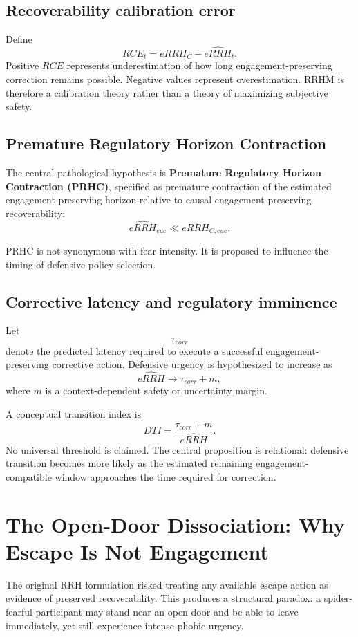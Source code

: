 \documentclass[9pt,twocolumn]{article}
\begin{document}
\subsection{Recoverability calibration error}
Define
\[
RCE_t=eRRH_C-\widehat{eRRH}_t.
\]
Positive $RCE$ represents underestimation of how long engagement-preserving correction remains possible. Negative values represent overestimation. RRHM is therefore a calibration theory rather than a theory of maximizing subjective safety.

\subsection{Premature Regulatory Horizon Contraction}
The central pathological hypothesis is \textbf{Premature Regulatory Horizon Contraction (PRHC)}, specified as premature contraction of the estimated engagement-preserving horizon relative to causal engagement-preserving recoverability:
\[
\widehat{eRRH}_{cue}\ll eRRH_{C,cue}.
\]

PRHC is not synonymous with fear intensity. It is proposed to influence the timing of defensive policy selection.

\subsection{Corrective latency and regulatory imminence}
Let
\[
\tau_{corr}
\]
denote the predicted latency required to execute a successful engagement-preserving corrective action. Defensive urgency is hypothesized to increase as
\[
\widehat{eRRH}\rightarrow \tau_{corr}+m,
\]
where $m$ is a context-dependent safety or uncertainty margin.

A conceptual transition index is
\[
DTI=\frac{\tau_{corr}+m}{\widehat{eRRH}}.
\]
No universal threshold is claimed. The central proposition is relational: defensive transition becomes more likely as the estimated remaining engagement-compatible window approaches the time required for correction.

\section{The Open-Door Dissociation: Why Escape Is Not Engagement}
The original RRH formulation risked treating any available escape action as evidence of preserved recoverability. This produces a structural paradox: a spider-fearful participant may stand near an open door and be able to leave immediately, yet still experience intense phobic urgency.
\end{document}
